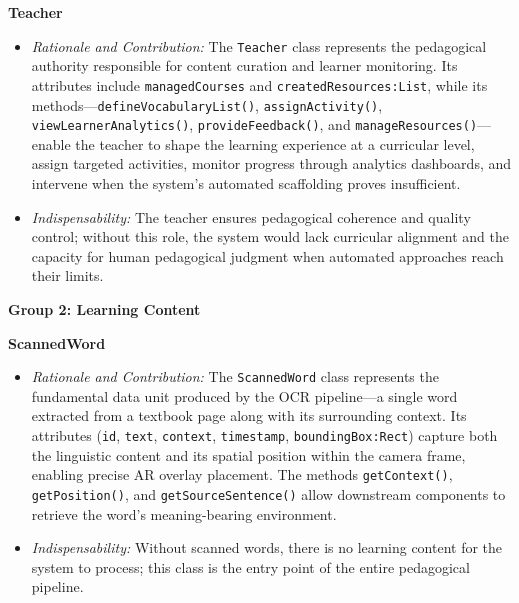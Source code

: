 \medskip
\textbf{Teacher}
\begin{itemize}
\item \textit{Rationale and Contribution:} The \texttt{Teacher} class represents the pedagogical authority responsible for content curation and learner monitoring. Its attributes include \texttt{managedCourses} and \texttt{createdResources:List}, while its methods---\texttt{defineVocabularyList()}, \texttt{assignActivity()}, \texttt{viewLearnerAnalytics()}, \texttt{provideFeedback()}, and \texttt{manageResources()}---enable the teacher to shape the learning experience at a curricular level, assign targeted activities, monitor progress through analytics dashboards, and intervene when the system's automated scaffolding proves insufficient.
\item \textit{Indispensability:} The teacher ensures pedagogical coherence and quality control; without this role, the system would lack curricular alignment and the capacity for human pedagogical judgment when automated approaches reach their limits.
\end{itemize}

\bigskip
\noindent\textbf{Group 2: Learning Content}

\medskip
\textbf{ScannedWord}
\begin{itemize}
\item \textit{Rationale and Contribution:} The \texttt{ScannedWord} class represents the fundamental data unit produced by the OCR pipeline---a single word extracted from a textbook page along with its surrounding context. Its attributes (\texttt{id}, \texttt{text}, \texttt{context}, \texttt{timestamp}, \texttt{boundingBox:Rect}) capture both the linguistic content and its spatial position within the camera frame, enabling precise AR overlay placement. The methods \texttt{getContext()}, \texttt{getPosition()}, and \texttt{getSourceSentence()} allow downstream components to retrieve the word's meaning-bearing environment.
\item \textit{Indispensability:} Without scanned words, there is no learning content for the system to process; this class is the entry point of the entire pedagogical pipeline.
\end{itemize}

